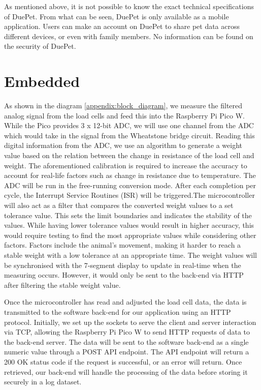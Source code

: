 As mentioned above, it is not possible to know the exact technical specifications of DuePet. From what can be seen, DuePet is only available as a mobile application. Users can make an account on DuePet to share pet data across different devices, or even with family members. No information can be found on the security of DuePet.

\section{Embedded}

As shown in the diagram \ref{appendix:block_diagram}, we measure the filtered analog signal from the load cells and feed this into the Raspberry Pi Pico W. While the Pico provides 3 x 12-bit ADC, we will use one channel from the ADC which would take in the signal from the Wheatstone bridge circuit. Reading this digital information from the ADC, we use an algorithm to generate a weight value based on the relation between the change in resistance of the load cell and weight. The aforementioned calibration is required to increase the accuracy to account for real-life factors such as change in resistance due to temperature. The ADC will be run in the free-running conversion mode. After each completion per cycle, the Interrupt Service Routines (ISR) will be triggered.The microcontroller will also act as a filter that compares the converted weight values to a set tolerance value. This sets the limit boundaries and indicates the stability of the values. While having lower tolerance values would result in higher accuracy, this would require testing to find the most appropriate values while considering other factors. Factors include the animal's movement, making it harder to reach a stable weight with a low tolerance at an appropriate time. The weight values will be synchronised with the 7-segment display to update in real-time when the measuring occurs. However, it would only be sent to the back-end via HTTP after filtering the stable weight value.

Once the microcontroller has read and adjusted the load cell data, the data is transmitted to the software back-end for our application using an HTTP protocol. Initially, we set up the sockets to serve the client and server interaction via TCP, allowing the Raspberry Pi Pico W to send HTTP requests of data to the back-end server. The data will be sent to the software back-end as a single numeric value through a POST API endpoint. The API endpoint will return a 200 OK status code if the request is successful, or an error will return. Once retrieved, our back-end will handle the processing of the data before storing it securely in a log dataset.


